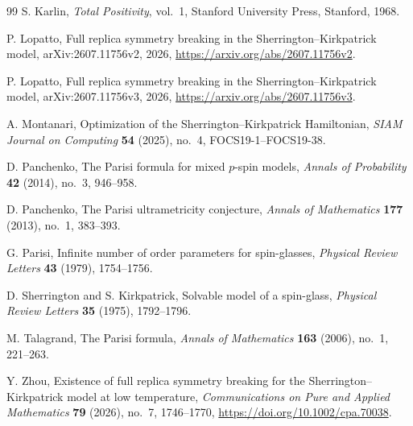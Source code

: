 \documentclass[10pt]{amsart}
\theoremstyle{definition}
\theoremstyle{remark}
\numberwithin{equation}{section}
\newcommand{\1}{\mathbf 1}
\begin{document}
\begin{thebibliography}{99}
S. Karlin,
\newblock \emph{Total Positivity}, vol.~1,
\newblock Stanford University Press, Stanford, 1968.

P. Lopatto,
\newblock Full replica symmetry breaking in the Sherrington--Kirkpatrick model,
\newblock arXiv:2607.11756v2, 2026,
\newblock \url{https://arxiv.org/abs/2607.11756v2}.

P. Lopatto,
\newblock Full replica symmetry breaking in the Sherrington--Kirkpatrick model,
\newblock arXiv:2607.11756v3, 2026,
\newblock \url{https://arxiv.org/abs/2607.11756v3}.

A. Montanari,
\newblock Optimization of the Sherrington--Kirkpatrick Hamiltonian,
\newblock \emph{SIAM Journal on Computing} \textbf{54} (2025), no.~4, FOCS19-1--FOCS19-38.

D. Panchenko,
\newblock The Parisi formula for mixed $p$-spin models,
\newblock \emph{Annals of Probability} \textbf{42} (2014), no.~3, 946--958.

D. Panchenko,
\newblock The Parisi ultrametricity conjecture,
\newblock \emph{Annals of Mathematics} \textbf{177} (2013), no.~1, 383--393.

G. Parisi,
\newblock Infinite number of order parameters for spin-glasses,
\newblock \emph{Physical Review Letters} \textbf{43} (1979), 1754--1756.

D. Sherrington and S. Kirkpatrick,
\newblock Solvable model of a spin-glass,
\newblock \emph{Physical Review Letters} \textbf{35} (1975), 1792--1796.

M. Talagrand,
\newblock The Parisi formula,
\newblock \emph{Annals of Mathematics} \textbf{163} (2006), no.~1, 221--263.

Y. Zhou,
\newblock Existence of full replica symmetry breaking for the Sherrington--Kirkpatrick model at low temperature,
\newblock \emph{Communications on Pure and Applied Mathematics} \textbf{79} (2026), no.~7, 1746--1770,
\newblock \url{https://doi.org/10.1002/cpa.70038}.

\end{thebibliography}
\end{document}
